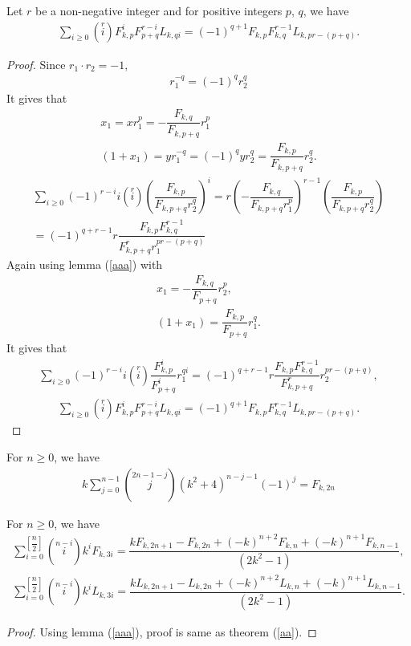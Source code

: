 \begin{theorem}\label{aa}
Let $r$ be a non-negative integer and for positive integers $p$, $q$, we have
\begin{align*}
\sum_{i \geq 0}\left(\stackrel{r}{i}\right)F_{k,p}^i F_{p+q}^{r-i}L_{k, qi} = (-1)^{q+1} F_{k,p}F_{k,q}^{r-1} L_{k, pr-(p+q)}.
\end{align*}
\end{theorem}
\begin{proof}
Since $r_1\cdot r_2 = -1$, 
\begin{align*}
r_1^{-q} = (-1)^q r_2^q
\end{align*}
It gives that
\begin{align*}
x_1 = x r_1^p = -\dfrac{F_{k,q}}{F_{k,p+q}}r_1^p\\
(1+x_1) = y r_1^{-q} = (-1)^q y r_2^q = \dfrac{F_{k,p}}{F_{k,p+q}}r_2^q.
\end{align*}
\begin{align*}
\sum_{i \geq 0}(-1)^{r-i}i \left(\stackrel{r}{i}\right) 
\left(\dfrac{F_{k,p}}{F_{k,p+q}r_2^q}\right)^i =  r\left(- \dfrac{F_{k,q}}{F_{k,p+q}r_1^p}\right)^{r-1}\left(\dfrac{F_{k,p}}{F_{k,p+q}r_2^q}\right)\\
= (-1)^{q+r-1}r\dfrac{F_{k,p}F_{k,q}^{r-1}}{F_{k,p+q}^rr_1^{pr-(p+q)}}
\end{align*}
Again using lemma (\ref{aaa}) with
\begin{align*}
x_1 = -\dfrac{F_{k,q}}{F_{p+q}}r_2^p,\\
(1+x_1) = \dfrac{F_{k,p}}{F_{p+q}}r_1^q .
\end{align*}
It gives that
\begin{align*}
\sum_{i \geq 0}(-1)^{r-i}i \left(\stackrel{r}{i}\right)\dfrac{F_{k,p}^i}{F_{p+q}^i}r_1^{qi} = (-1)^{q+r-1} r \dfrac{F_{k,p}F_{k,q}^{r-1}}{F_{k,p+q}^r}r_2^{pr-(p+q)},
\end{align*}
\begin{align*}
\sum_{i \geq 0}\left(\stackrel{r}{i}\right)F_{k,p}^i F_{p+q}^{r-i}L_{k, qi} = (-1)^{q+1} F_{k,p}F_{k,q}^{r-1} L_{k, pr-(p+q)}.
\end{align*}
\end{proof}
\begin{lemma}
For $n \geq 0$, we have
\begin{align*}
k \sum_{j=0}^{n-1}\left(\stackrel{2n-1-j}{j}\right)(k^2+4)^{n-j-1}(-1)^j = F_{k,2n}
\end{align*}
\end{lemma}
\begin{theorem}
For $n \geq 0$, we have
\begin{align*}
\sum_{i = 0}^{\left[\dfrac{n}{2}\right]}\left(\stackrel{n-i}{i}\right)k^iF_{k,3i} = \dfrac{k F_{k,2n+1}- F_{k,2n}+(-k)^{n+2}F_{k,n}+(-k)^{n+1}F_{k,n-1}}{(2k^2-1)},\\
\sum_{i = 0}^{\left[\dfrac{n}{2}\right]}\left(\stackrel{n-i}{i}\right)k^iL_{k,3i} = \dfrac{k L_{k,2n+1}- L_{k,2n}+(-k)^{n+2}L_{k,n}+(-k)^{n+1}L_{k,n-1}}{(2k^2-1)}.
\end{align*}
\end{theorem}
\begin{proof}
Using lemma (\ref{aaa}), proof is same as theorem (\ref{aa}).
\end{proof}

